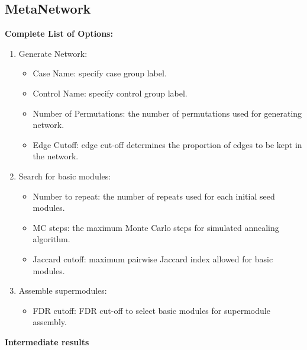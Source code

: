 \subsection{MetaNetwork}
\label{sec:completeList_MetaNetwork}

\textbf{Complete List of Options:} 
\begin{enumerate}
\item Generate Network:
\begin{itemize}
\item Case Name: specify case group label.
\item Control Name: specify control group label.
\item Number of Permutations: the number of permutations used for generating network.
\item Edge Cutoff: edge cut-off  determines the proportion of edges to be kept in the network.
\end{itemize}

\item Search for basic modules:
\begin{itemize}
\item Number to repeat:  the number of repeats used for each initial seed modules.
\item MC steps:  the maximum Monte Carlo steps for simulated annealing algorithm.
\item Jaccard cutoff: maximum pairwise Jaccard index allowed for basic modules.
\end{itemize}
\item Assemble supermodules:

\begin{itemize}
\item FDR cutoff:  FDR cut-off to select basic modules for supermodule assembly.
\end{itemize}
\end{enumerate}

\textbf{Intermediate results}
 
